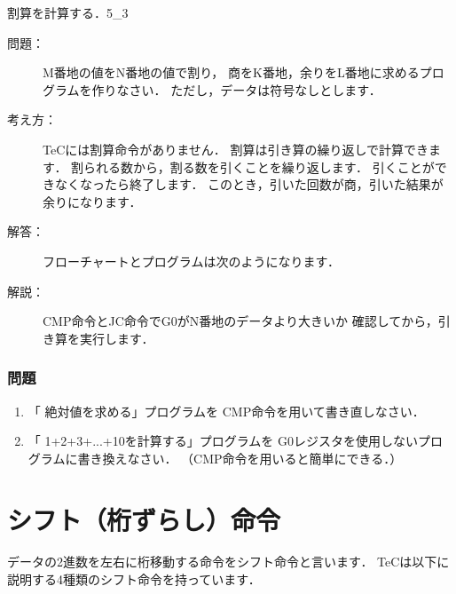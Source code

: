 \newpage
\begin{reidai}{割算を計算する．}{5_3}
  \begin{description}
  \item[問題：]
    M番地の値をN番地の値で割り，
    商をK番地，余りをL番地に求めるプログラムを作りなさい．
    ただし，データは符号なしとします．

  \item[考え方：]
    TeCには割算命令がありません．
    割算は引き算の繰り返しで計算できます．
    割られる数から，割る数を引くことを繰り返します．
    引くことができなくなったら終了します．
    このとき，引いた回数が商，引いた結果が余りになります．

  \item[解答：]
    フローチャートとプログラムは次のようになります．\\

    \begin{center}
    \end{center}

  \item[解説：]CMP命令とJC命令でG0がN番地のデータより大きいか
    確認してから，引き算を実行します．

  \end{description}
\end{reidai}

\vfill
\subsubsection{問題}
\begin{enumerate}
\item 「 絶対値を求める」プログラムを
  CMP命令を用いて書き直しなさい．

\item 「 1+2+3+...+10を計算する」プログラムを
  G0レジスタを使用しないプログラムに書き換えなさい．
  （CMP命令を用いると簡単にできる．）
\end{enumerate}
\vfill

\newpage
\section{シフト（桁ずらし）命令}
データの2進数を左右に桁移動する命令をシフト命令と言います．
TeCは以下に説明する4種類のシフト命令を持っています．

